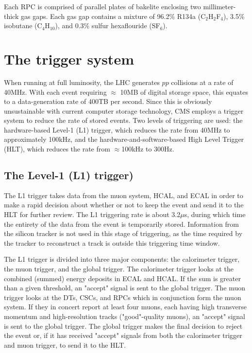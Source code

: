 Each RPC is comprised of parallel plates of bakelite enclosing two millimeter-thick gas gaps. Each gas gap contains a mixture of 96.2\% R134a (C$_2$H$_2$F$_4$), 3.5\% isobutane (C$_4$H$_10$), and 0.3\% sulfur hexaflouride (SF$_6$).

\section{The trigger system}

When running at full luminosity, the LHC generates $pp$ collisions at a rate of 40MHz. With each event requiring $\approx$ 10MB of digital storage space, this equates to a data-generation rate of 400TB per second. Since this is obviously unsustainable with current computer storage technology, CMS employs a trigger system to reduce the rate of stored events. Two levels of triggering are used: the hardware-based Level-1 (L1) trigger, which reduces the rate from 40MHz to approximately 100kHz, and the hardware-and-software-based High Level Trigger (HLT), which reduces the rate from $\approx$100kHz to 300Hz.

\subsection{The Level-1 (L1) trigger)}

The L1 trigger takes data from the muon system, HCAL, and ECAL in order to make a rapid decision about whether or not to keep the event and send it to the HLT for further review. The L1 triggering rate is about 3.2$\mu$s, during which time the entirety of the data from the event is temporarily stored. Information from the silicon tracker is not used in this stage of triggering, as the time required by the tracker to reconstruct a track is outside this triggering time window. 

The L1 trigger is divided into three major components: the calorimeter trigger, the muon trigger, and the global trigger. The calorimeter trigger looks at the combined (summed) energy deposits in ECAL and HCAL. If the sum is greater than a given threshold, an "accept" signal is sent to the global trigger. The muon trigger looks at the DTs, CSCs, and RPCs which in conjunction form the muon system. If they in concert report at least four muons, each having high transverse momentum and high-resolution tracks ("good"-quality muons), an "accept" signal is sent to the global trigger. The global trigger makes the final decision to reject the event or, if it has received "accept" signals from both the calorimeter trigger and muon trigger, to send it to the HLT.

